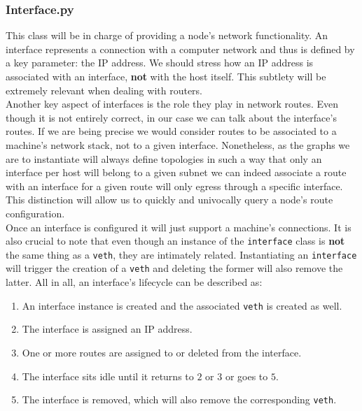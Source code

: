 \subsubsection{Interface.py}
    This class will be in charge of providing a node's network functionality. An interface represents a connection with a computer network and thus is defined by a key parameter: the IP address. We should stress how an IP address is associated with an interface, \textbf{not} with the host itself. This subtlety will be extremely relevant when dealing with routers.\\

    Another key aspect of interfaces is the role they play in network routes. Even though it is not entirely correct, in our case we can talk about the interface's routes. If we are being precise we would consider routes to be associated to a machine's network stack, not to a given interface. Nonetheless, as the graphs we are to instantiate will always define topologies in such a way that only an interface per host will belong to a given subnet we can indeed associate a route with an interface for a given route will only egress through a specific interface. This distinction will allow us to quickly and univocally query a node's route configuration.\\

    Once an interface is configured it will just support a machine's connections. It is also crucial to note that even though an instance of the \texttt{interface} class is \textbf{not} the same thing as a \texttt{veth}, they are intimately related. Instantiating an \texttt{interface} will trigger the creation of a \texttt{veth} and deleting the former will also remove the latter. All in all, an interface's lifecycle can be described as:\\

    \begin{enumerate}
        \item An interface instance is created and the associated \texttt{veth} is created as well.
        \item The interface is assigned an IP address.
        \item One or more routes are assigned to or deleted from the interface.
        \item The interface sits idle until it returns to $2$ or $3$ or goes to $5$.
        \item The interface is removed, which will also remove the corresponding \texttt{veth}.
    \end{enumerate}

